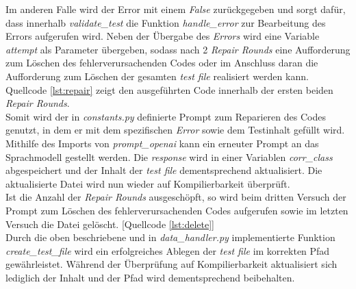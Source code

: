 \vspace{-.3cm} 
Im anderen Falle wird der Error mit einem \textit{False} zurückgegeben und sorgt dafür, dass innerhalb \textit{validate\_test} die Funktion \textit{handle\_error} zur Bearbeitung des Errors aufgerufen wird. Neben der Übergabe des \textit{Errors} wird eine Variable \textit{attempt} als Parameter übergeben, sodass nach 2 \textit{Repair Rounds} eine Aufforderung zum Löschen des fehlerverursachenden Codes oder im Anschluss daran die Aufforderung zum Löschen der gesamten \textit{test file} realisiert werden kann. \\Quellcode \ref{lst:repair} zeigt den ausgeführten Code innerhalb der ersten beiden \textit{Repair Rounds}.\\
\vspace{-.3cm}
Somit wird der in \textit{constants.py} definierte Prompt zum Reparieren des Codes genutzt, in dem er mit dem spezifischen \textit{Error} sowie dem Testinhalt gefüllt wird. Mithilfe des Imports von \textit{prompt\_openai} kann ein erneuter Prompt an das Sprachmodell gestellt werden. Die \textit{response} wird in einer Variablen \textit{corr\_class} abgespeichert und der Inhalt der \textit{test file} dementsprechend aktualisiert. Die aktualisierte Datei wird nun wieder auf Kompilierbarkeit überprüft. \\Ist die Anzahl der \textit{Repair Rounds} ausgeschöpft, so wird beim dritten Versuch der Prompt zum Löschen des fehlerverursachenden Codes aufgerufen sowie im letzten Versuch die Datei gelöscht. [Quellcode \ref{lst:delete}]\\
\vspace{-.3cm}
Durch die oben beschriebene und in \textit{data\_handler.py} implementierte Funktion \textit{create\_test\_file} wird ein erfolgreiches Ablegen der \textit{test file} im korrekten Pfad gewährleistet. Während der Überprüfung auf Kompilierbarkeit aktualisiert sich lediglich der Inhalt und der Pfad wird dementsprechend beibehalten.

